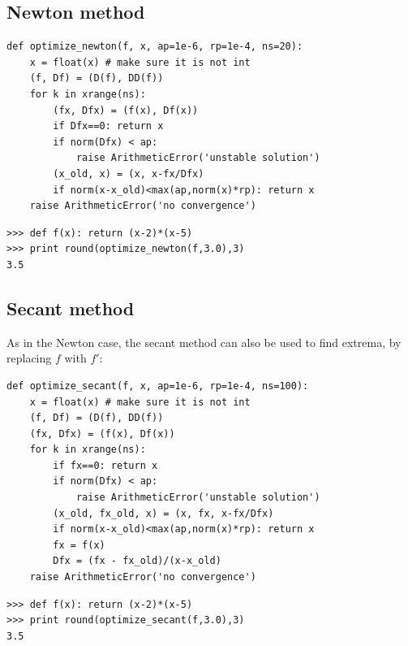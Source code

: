\documentclass[justified,sixbynine]{tufte-book}
\def\ft{\small\tt}
\theoremstyle{plain}%
\theoremstyle{definition}
\theoremstyle{remark}
\begin{document}
\begin{fullwidth}
\goodbreak\subsection{Newton method}


\begin{lstlisting}[caption={in file: {\ft nlib.py}}]
def optimize_newton(f, x, ap=1e-6, rp=1e-4, ns=20):
    x = float(x) # make sure it is not int
    (f, Df) = (D(f), DD(f))
    for k in xrange(ns):
        (fx, Dfx) = (f(x), Df(x))
        if Dfx==0: return x
        if norm(Dfx) < ap:
            raise ArithmeticError('unstable solution')
        (x_old, x) = (x, x-fx/Dfx)
        if norm(x-x_old)<max(ap,norm(x)*rp): return x
    raise ArithmeticError('no convergence')
\end{lstlisting}

\begin{lstlisting}[caption={in file: {\ft nlib.py}}]
>>> def f(x): return (x-2)*(x-5)
>>> print round(optimize_newton(f,3.0),3)
3.5
\end{lstlisting}

\goodbreak\subsection{Secant method}


As in the Newton case, the secant method can also be used to find extrema, by replacing $f$ with $f'$:

\begin{lstlisting}[caption={in file: {\ft nlib.py}}]
def optimize_secant(f, x, ap=1e-6, rp=1e-4, ns=100):
    x = float(x) # make sure it is not int
    (f, Df) = (D(f), DD(f))
    (fx, Dfx) = (f(x), Df(x))
    for k in xrange(ns):
        if fx==0: return x
        if norm(Dfx) < ap:
            raise ArithmeticError('unstable solution')
        (x_old, fx_old, x) = (x, fx, x-fx/Dfx)
        if norm(x-x_old)<max(ap,norm(x)*rp): return x
        fx = f(x)
        Dfx = (fx - fx_old)/(x-x_old)
    raise ArithmeticError('no convergence')
\end{lstlisting}

\begin{lstlisting}[caption={in file: {\ft nlib.py}}]
>>> def f(x): return (x-2)*(x-5)
>>> print round(optimize_secant(f,3.0),3)
3.5
\end{lstlisting}


\end{fullwidth}
\end{document}
